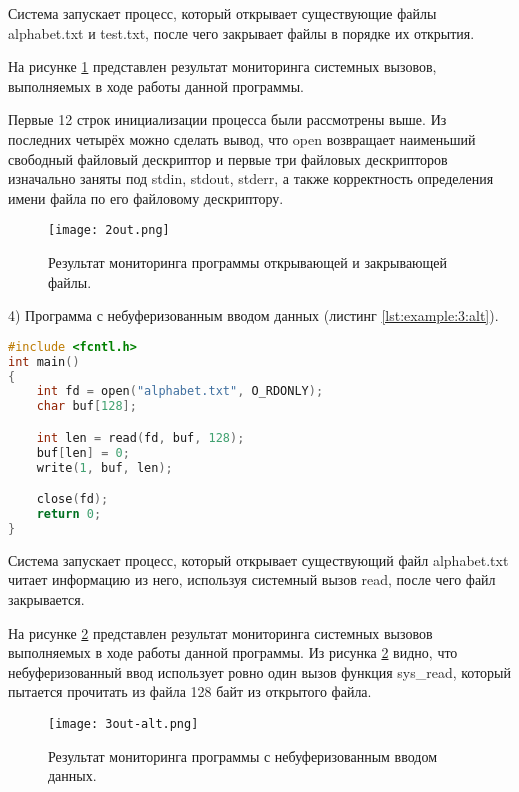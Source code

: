         Система запускает процесс, который открывает существующие файлы alphabet.txt и test.txt,
        после чего закрывает файлы в порядке их открытия.
        
        На рисунке \ref{examples:2out} представлен результат мониторинга системных вызовов,
        выполняемых в ходе работы данной программы.

        Первые 12 строк инициализации процесса были рассмотрены выше.
        Из последних четырёх можно сделать вывод, что
        open возвращает наименьший свободный файловый дескриптор и
        первые три файловых дескрипторов изначально заняты под stdin, stdout, stderr,
        а также корректность определения имени файла по его файловому дескриптору.

        \begin{figure}[h!]
            \centering
            \texttt{[image: 2out.png]}
            \caption{Результат мониторинга программы открывающей и закрывающей файлы.}
            \label{examples:2out}
        \end{figure}

    4) Программа с небуферизованным вводом данных (листинг \ref{lst:example:3:alt}).
        \begin{lstlisting}[language=C, label=lst:example:3:alt, caption=Программа с небуфферизованным вводом данных из файла]
#include <fcntl.h>
int main()
{
    int fd = open("alphabet.txt", O_RDONLY);
    char buf[128];

    int len = read(fd, buf, 128);
    buf[len] = 0;
    write(1, buf, len);

    close(fd);
    return 0;
}
        \end{lstlisting}
        
        Система запускает процесс, который открывает существующий файл alphabet.txt
        читает информацию из него, используя системный вызов read, после чего файл закрывается.

        На рисунке \ref{examples:3out:alt} представлен результат мониторинга системных вызовов
        выполняемых в ходе работы данной программы.
        Из рисунка \ref{examples:3out:alt} видно, что небуферизованный ввод использует ровно один вызов функция sys\_read,
        который пытается прочитать из файла 128 байт из открытого файла.

        \begin{figure}[h!]
            \centering
            \texttt{[image: 3out-alt.png]}
            \caption{Результат мониторинга программы с небуферизованным вводом данных.}
            \label{examples:3out:alt}
        \end{figure}


